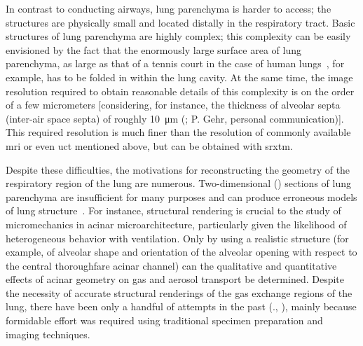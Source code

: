 In contrast to conducting airways, lung parenchyma is harder to access; the structures are physically small and located distally in the respiratory tract. Basic structures of lung parenchyma are highly complex; this complexity can be easily envisioned by the fact that the enormously large surface area of lung parenchyma, as large as that of a tennis court in the case of human lungs~\cite{Gehr1978,Weibel1963}, for example, has to be folded in within the lung cavity. At the same time, the image resolution required to obtain reasonable details of this complexity is on the order of a few micrometers [considering, for instance, the thickness of alveolar septa (inter-air space septa) of roughly \SI{10}{\micro\meter} (\cite{Gehr1978}; P. Gehr, personal communication)]. This required resolution is much finer than the resolution of commonly available \ac{mri} or even \ac{uct} mentioned above, but can be obtained with \ac{srxtm}.

Despite these difficulties, the motivations for reconstructing the \threed geometry of the respiratory region of the lung are numerous. Two-dimensional (\twod) sections of lung parenchyma are insufficient for many purposes and can produce erroneous models of lung structure~\cite{Cookson1993}. For instance, \threed structural rendering is crucial to the study of micromechanics in \threed acinar microarchitecture, particularly given the likelihood of heterogeneous behavior with ventilation. Only by using a realistic \threed structure (for example, of alveolar shape and orientation of the alveolar opening with respect to the central thoroughfare acinar channel) can the qualitative and quantitative effects of \threed acinar geometry on gas and aerosol transport be determined. Despite the necessity of accurate \threed structural renderings of the gas exchange regions of the lung, there have been only a handful of attempts in the past (\eg., \cite{Berend1991,Cookson1993,Honda2002,Litzlbauer2006,Mercer1987,Mercer1987a,Randell1989,Stelter1966,Watz2005}), mainly because formidable effort was required using traditional specimen preparation and imaging techniques.

